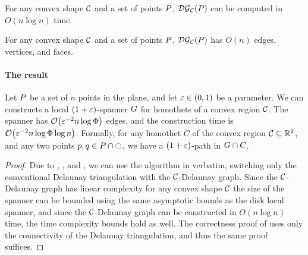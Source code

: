 \documentclass[12pt]{article}%
\begin{document}
\begin{theorem}
    For any convex shape $\mathcal{C}$ and a set of points $P$,
    $\mathcal{DG}_{\mathcal{C}}(P)$ can be computed in $O(n \log n)$ time.
\end{theorem}

\begin{lemma}
    For any convex shape $\mathcal{C}$ and a set of points $P$,
    $\mathcal{DG}_{\mathcal{C}}(P)$ has $O(n)$ edges, vertices, and faces.
\end{lemma}


\paragraph{The result}
\begin{theorem}
    Let $P$ be a set of $n$ points in the plane, and let
    $\varepsilon \in (0,1)$ be a parameter. We can constructs a local
    $(1+\varepsilon)$-spanner $G$ for homothets of a convex region
    $\mathcal{C}$. The spanner has $\Of\pth{ \eps^{-2} n\log \spread }$ edges,
    and the construction time is
    $\Of\pth{ \eps^{-2} n\log \spread \log n }$.  Formally, for any
    homothet $C$ of the convex region $\mathcal{C}\subseteq \mathbb{R}^2$, and any
    two points $p, q \in P \cap \ocircle$, we have a
    $(1+\varepsilon)$-path in $G \cap {C}$.
\end{theorem}

\begin{proof}
    Due to ,
    , and , we can use
    the algorithm in  verbatim, switching
    only the conventional Delaunay triangulation with the
    $\mathcal{C}$-Delaunay graph. Since the $\mathcal{C}$-Delaunay graph has linear
    complexity for any convex shape $\mathcal{C}$ the size of the spanner can
    be bounded using the same asymptotic bounds as the disk local
    spanner, and since the $\mathcal{C}$-Delaunay graph can be constructed in
    $O(n\log n)$ time, the time complexity bounds hold as well. The
    correctness proof of  uses only the connectivity of
    the Delaunay triangulation, and thus the same proof suffices.


\end{proof}



\end{document}
